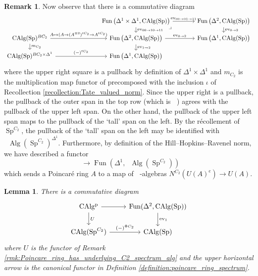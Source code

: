 \documentclass{article}
\DeclareMathOperator{\Alg}{Alg} %
\DeclareMathOperator{\CAlg}{CAlg} %
\DeclareMathOperator{\CAlgp}{CAlg^p} %
\DeclareMathOperator{\Einfty}{\mathbf{E}_\infty} %
\DeclareMathOperator{\Fun}{Fun} %
\DeclareMathOperator{\Spectra}{Sp} %
\newtheorem{lemma}[equation]{Lemma}
\theoremstyle{definition}
\newtheorem{remark}[equation]{Remark}
\newcommand{\Lucy}[1]{\todo[color=cyan!30]{\linespread{1}\footnotesize L: #1}}
\begin{document}
\begin{remark}
    Now observe that there is a commutative diagram
    \begin{equation*}
    \begin{tikzcd}[column sep=large,row sep=small]
        && \Fun\left(\Delta^1 \times \Delta^1,\CAlg(\Spectra) \right) \ar[r,"{\mathrm{ev}_{00 \to 01 \to 11}}"] \ar[d,"{\mathrm{ev}_{00 \to 10 \to 11}}"] \ar[rd,phantom,"\lrcorner",very near start] & \Fun\left(\Delta^2, \CAlg(\Spectra)\right) \ar[d,"{\mathrm{ev}_{0\to 2}}"] \\
        \CAlg(\Spectra)^{BC_2} \ar[d,"{m_{C_2}}"] \ar[rr,"{A \mapsto (A \to (A^{\otimes 2})^{tC_2} \to A^{tC_2})}"] & &\Fun\left(\Delta^2,\CAlg(\Spectra) \right) \ar[r,"{\mathrm{ev}_{0 \to 2}}"] \ar[d,"{\mathrm{ev}_{1\to 2}}"] & \Fun\left(\Delta^1,\CAlg(\Spectra) \right) \\
        \CAlg(\Spectra)^{BC_2 \times \Delta^1} \ar[rr,"{(-)^{tC_2}}"] && \Fun\left(\Delta^1 ,\CAlg(\Spectra) \right) &
    \end{tikzcd}
    \end{equation*}
    where the upper right square is a pullback by definition of $ \Delta^1 \times \Delta^1 $ and $ m_{C_2} $ is the multiplication map functor of \cite[Construction 3.1]{LYang_normedrings} precomposed with the inclusion $ \iota $ of Recollection \ref{recollection:Tate_valued_norm}. 
    Since the upper right is a pullback, the pullback of the outer span in the top row (which is $ \CAlgp $) agrees with the pullback of the upper left span. 
    On the other hand, the pullback of the upper left span maps to the pullback of the `tall' span on the left. 
    By the récollement of $ \Spectra^{C_2} $, the pullback of the `tall' span on the left may be identified with $ \Einfty \Alg\left(\Spectra^{C_2}\right)^{\Delta^1} $. 
    Furthermore, by definition of the Hill--Hopkins--Ravenel norm, we have described a functor
    \begin{equation}\label{eq:Poincare_ring_functorial_norm}
        \CAlgp \to \Fun\left(\Delta^1,\Einfty \Alg\left(\Spectra^{C_2}\right)\right)
    \end{equation}
    which sends a Poincaré ring $ A $ to a map of $ \Einfty $-algebras $ N^{C_2}(U(A)^e) \to U(A) $. 
\end{remark}
\begin{lemma}\label{lemma:Poincare_ring_geom_fixpt}
    There is a commutative diagram
    \begin{equation*}
    \begin{tikzcd}
        \CAlgp \ar[r] \ar[d,"U"] & \operatorname{Fun}(\Delta^2,\CAlg(\Spectra)) \ar[d,"{\mathrm{ev}_1}"] \\
        \CAlg(\Spectra^{C_2}) \ar[r,"{(-)^{\Phi C_2}}"] & \CAlg(\Spectra)
    \end{tikzcd}
    \end{equation*}
    where $ U $ is the functor of Remark \ref{rmk:Poincare_ring_has_underlying_C2_spectrum_alg} and the upper horizontal arrow is the canonical functor in Definition \ref{definition:poincare_ring_spectrum}. %
\end{lemma}
\end{document}
